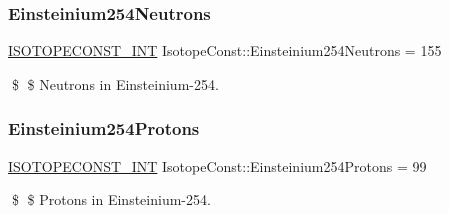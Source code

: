 \subsubsection{\texorpdfstring{Einsteinium254\+Neutrons}{Einsteinium254Neutrons}}
{\footnotesize\ttfamily \mbox{\hyperlink{group___isotope_const-_macros_ga5f18360b3e99483a35c32d789e62621c}{I\+S\+O\+T\+O\+P\+E\+C\+O\+N\+S\+T\+\_\+\+I\+NT}} Isotope\+Const\+::\+Einsteinium254\+Neutrons = 155}

\$ \$ Neutrons in Einsteinium-\/254. \mbox{\label{group___isotope_const-_einsteinium-_es254_gaf45afd48ead1d426766b16bfa0173618}} 
\subsubsection{\texorpdfstring{Einsteinium254\+Protons}{Einsteinium254Protons}}
{\footnotesize\ttfamily \mbox{\hyperlink{group___isotope_const-_macros_ga5f18360b3e99483a35c32d789e62621c}{I\+S\+O\+T\+O\+P\+E\+C\+O\+N\+S\+T\+\_\+\+I\+NT}} Isotope\+Const\+::\+Einsteinium254\+Protons = 99}

\$ \$ Protons in Einsteinium-\/254. 